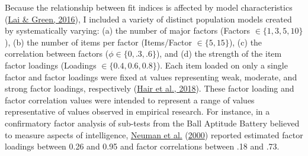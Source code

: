\documentclass[11pt]{umnthesis}
\begin{document}
Because the relationship between fit indices is affected by model characteristics (\protect\hyperlink{ref-lai2016}{Lai \& Green, 2016}), I included a variety of distinct population models created by systematically varying: (a) the number of major factors (Factors \(\in \{1, 3, 5, 10\}\)), (b) the number of items per factor (Items/Factor \(\in \{5, 15 \}\)), (c) the correlation between factors (\(\phi \in \{0, .3, .6\}\)), and (d) the strength of the item factor loadings (Loadings \(\in \{0.4, 0.6, 0.8 \}\)). Each item loaded on only a single factor and factor loadings were fixed at values representing weak, moderate, and strong factor loadings, respectively (\protect\hyperlink{ref-hair2018}{Hair et al., 2018}). These factor loading and factor correlation values were intended to represent a range of values representative of values observed in empirical research. For instance, in a confirmatory factor analysis of sub-tests from the Ball Aptitude Battery believed to measure aspects of intelligence, \protect\hyperlink{ref-neuman2000}{Neuman et al.} (\protect\hyperlink{ref-neuman2000}{2000}) reported estimated factor loadings between 0.26 and 0.95 and factor correlations between .18 and .73.
\end{document}
